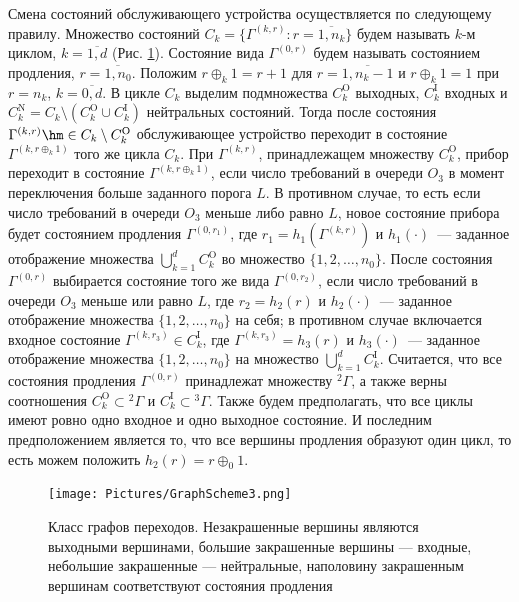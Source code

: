 Смена состояний обслуживающего устройства осуществляется по следующему правилу. Множество состояний $C_k = \{\Gamma^{(k, r)} \colon r=\overline{1, n_k}\}$ будем называть $k$-м циклом,  $k=\overline{1, d}$ (Рис. \ref{GraphScheme}). Состояние вида $\Gamma^{(0, r)}$ будем называть состоянием продления,  $r=\overline{1, n_0}$. Положим $r \oplus_k 1 = r+1$ для $r=\overline{1, n_k-1}$ и $r \oplus_k 1 = 1$ при $r=n_k$,  $k = \overline{0, d}$. В цикле $C_k$ выделим подмножества $C_k^{\mathrm{O}}$ выходных,  $C_k^{\mathrm{I}}$ входных и $C_k^{\mathrm{N}} = C_k \setminus (C_k^{\mathrm{O}} \cup C_k^{\mathrm{I}})$ нейтральных состояний. Тогда после состояния $\Gamma^{(k, r)} \hm\in C_k\setminus C_k^{\mathrm{O}}$ обслуживающее устройство переходит в состояние $\Gamma^{(k, r \oplus_k 1)}$ того же цикла $C_k$. При $\Gamma^{(k, r)}$,  принадлежащем множеству $C_k^{\mathrm{O}}$,  прибор переходит в состояние $\Gamma^{(k, r \oplus_k 1)}$,  если число требований в очереди $O_3$ в момент переключения больше заданного порога $L$. В противном случае,  то есть если число требований в очереди $O_3$ меньше либо равно $L$,  новое состояние прибора будет состоянием продления $\Gamma^{(0, r_1)}$,  где $r_1=h_1(\Gamma^{(k, r)})$ и $h_1(\cdot)$~--- заданное отображение множества $\bigcup\limits_{k=1}^d C_k^{\mathrm{O}}$ во множество $\{1, 2, \ldots,  n_0\}$. После состояния $\Gamma^{(0, r)}$ выбирается состояние того же вида $\Gamma^{(0, r_2)}$,  если число требований в очереди $O_3$ меньше или равно $L$,  где $r_2=h_2(r)$ и $h_2(\cdot)$~--- заданное отображение множества $\{1, 2,  \ldots,  n_0\}$ на себя; в противном случае включается входное состояние $\Gamma^{(k, r_3)} \in C_k^{\mathrm{I}}$,  где $\Gamma^{(k, r_3)}=h_3(r)$ и $h_3(\cdot)$~--- заданное отображение множества $\{1, 2,  \ldots,  n_0\}$ на множество  $\bigcup\limits_{k=1}^d C_k^{\mathrm{I}}$. Считается,  что все состояния продления $\Gamma^{(0, r)}$ принадлежат множеству ${}^2 \Gamma$,  а также верны соотношения $C_k^\mathrm{O}\subset {}^2 \Gamma$ и $C_k^\mathrm{I}\subset {}^3 \Gamma$. Также будем предполагать,  что все циклы имеют ровно одно входное и одно выходное состояние. И последним предположением является то,  что все вершины продления образуют один цикл,  то есть можем положить $h_2(r)=r\oplus_0 1$.

\begin{figure}[h]\centering
\texttt{[image: Pictures/GraphScheme3.png]} 
\caption{Класс графов переходов. Незакрашенные вершины являются выходными вершинами,  большие закрашенные вершины --- входные,  небольшие закрашенные --- нейтральные,  наполовину закрашенным вершинам соответствуют состояния продления}
\label{GraphScheme}
\end{figure}


